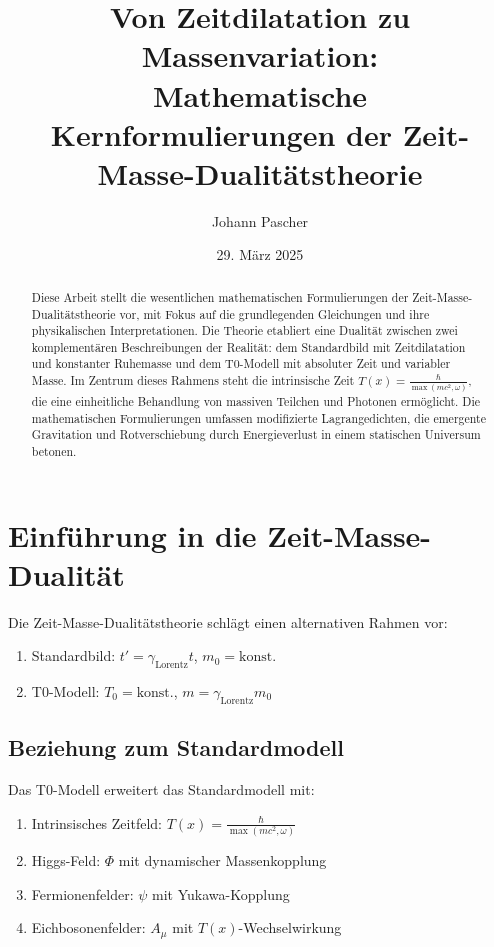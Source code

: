 \documentclass{article}
\title{Von Zeitdilatation zu Massenvariation: \\ Mathematische Kernformulierungen der Zeit-Masse-Dualitätstheorie}
\author{Johann Pascher}
\date{29. März 2025}
\newcommand{\Tfield}{T(x)}
\newcommand{\gammaf}{\gamma_{\text{Lorentz}}}
\theoremstyle{definition}
\theoremstyle{remark}
\begin{document}
	
	\maketitle
	
	\begin{abstract}
		Diese Arbeit stellt die wesentlichen mathematischen Formulierungen der Zeit-Masse-Dualitätstheorie vor, mit Fokus auf die grundlegenden Gleichungen und ihre physikalischen Interpretationen. Die Theorie etabliert eine Dualität zwischen zwei komplementären Beschreibungen der Realität: dem Standardbild mit Zeitdilatation und konstanter Ruhemasse und dem T0-Modell mit absoluter Zeit und variabler Masse. Im Zentrum dieses Rahmens steht die intrinsische Zeit \( \Tfield = \frac{\hbar}{\max(m c^2, \omega)} \), die eine einheitliche Behandlung von massiven Teilchen und Photonen ermöglicht. Die mathematischen Formulierungen umfassen modifizierte Lagrangedichten, die emergente Gravitation und Rotverschiebung durch Energieverlust in einem statischen Universum betonen.
	\end{abstract}
	
	\tableofcontents
	\newpage
	
	\section{Einführung in die Zeit-Masse-Dualität}
	Die Zeit-Masse-Dualitätstheorie schlägt einen alternativen Rahmen vor:
	\begin{enumerate}
		\item Standardbild: \( t' = \gammaf t \), \( m_0 = \text{konst.} \)
		\item T0-Modell: \( T_0 = \text{konst.} \), \( m = \gammaf m_0 \)
	\end{enumerate}
	
	\subsection{Beziehung zum Standardmodell}
	Das T0-Modell erweitert das Standardmodell mit:
	\begin{enumerate}
		\item Intrinsisches Zeitfeld: \( \Tfield = \frac{\hbar}{\max(m c^2, \omega)} \)
		\item Higgs-Feld: \( \Phi \) mit dynamischer Massenkopplung
		\item Fermionenfelder: \( \psi \) mit Yukawa-Kopplung
		\item Eichbosonenfelder: \( A_\mu \) mit \( \Tfield \)-Wechselwirkung
	\end{enumerate}
	
\end{document}
